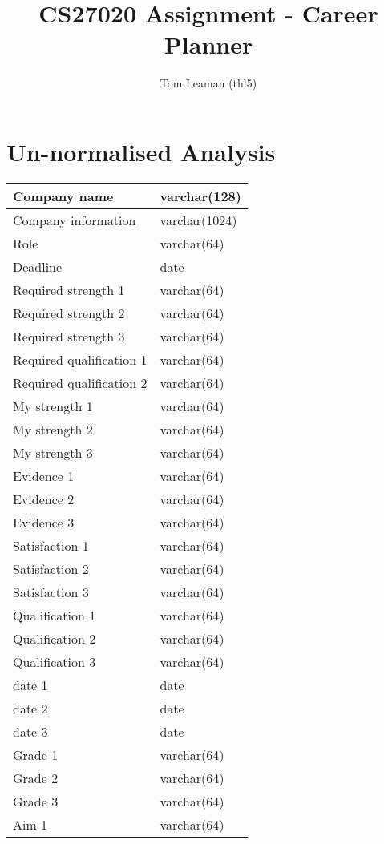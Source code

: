 \documentclass[a4paper, twoside]{article}
\title{CS27020 Assignment - Career Planner}
\author{Tom Leaman (thl5)}
\begin{document}
\maketitle
\newpage

\section{Un-normalised Analysis}
\begin{tabular}{|l|l|}
\hline
Company name & varchar(128) \\ \hline
Company information & varchar(1024) \\ \hline
Role & varchar(64) \\ \hline
Deadline & date \\ \hline
Required strength 1 & varchar(64) \\ \hline
Required strength 2 & varchar(64) \\ \hline
Required strength 3 & varchar(64) \\ \hline
Required qualification 1 & varchar(64) \\ \hline
Required qualification 2 & varchar(64) \\ \hline
My strength 1 & varchar(64) \\ \hline
My strength 2 & varchar(64) \\ \hline
My strength 3 & varchar(64) \\ \hline
Evidence 1 & varchar(64) \\ \hline
Evidence 2 & varchar(64) \\ \hline
Evidence 3 & varchar(64) \\ \hline
Satisfaction 1 & varchar(64) \\ \hline
Satisfaction 2 & varchar(64) \\ \hline
Satisfaction 3 & varchar(64) \\ \hline
Qualification 1 & varchar(64) \\ \hline
Qualification 2 & varchar(64) \\ \hline
Qualification 3 & varchar(64) \\ \hline
date 1 & date \\ \hline
date 2 & date \\ \hline
date 3 & date \\ \hline
Grade 1 & varchar(64) \\ \hline
Grade 2 & varchar(64) \\ \hline
Grade 3 & varchar(64) \\ \hline
Aim 1 & varchar(64) \\ \hline

\end{tabular}
\end{document}
